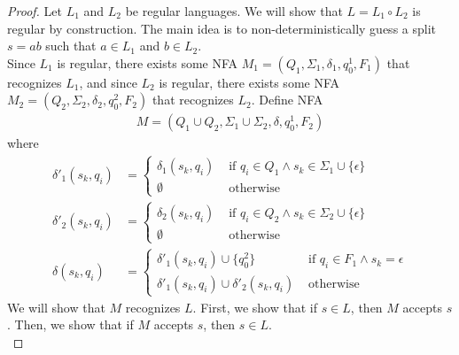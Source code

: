 \documentclass{article}
\begin{document}
\begin{proof}
    Let $L_1$ and $L_2$ be regular languages. We will show that $L = L_1 \circ L_2$ is regular by construction. The main idea is to non-deterministically guess 
    a split $s = a b$ such that $a \in L_1$ and $b \in L_2$. \\

    \noindent
    Since $L_1$ is regular, there exists some NFA $M_1 = (Q_1, \Sigma_1, \delta_1, q_0^1, F_1)$ that recognizes $L_1$, and since $L_2$ is regular, there exists
    some NFA $M_2 = (Q_2, \Sigma_2, \delta_2, q_0^2, F_2)$ that recognizes $L_2$. Define NFA
    \begin{align*}
        M = (Q_1 \cup Q_2, \Sigma_1 \cup \Sigma_2, \delta, q_0^1, F_2)
    \end{align*}
    where
    \begin{align*}
        \delta'_1(s_k, q_i) &= \begin{cases}
            \delta_1(s_k, q_i) & \text{ if } q_i \in Q_1 \land s_k \in \Sigma_1 \cup \{ \epsilon \} \\
            \emptyset & \text{ otherwise}
        \end{cases} \\
        \delta'_2(s_k, q_i) &= \begin{cases}
            \delta_2(s_k, q_i) & \text{ if } q_i \in Q_2 \land s_k \in \Sigma_2 \cup \{ \epsilon \} \\
            \emptyset & \text{ otherwise}
        \end{cases} \\
        \delta(s_k, q_i) &= \begin{cases}
            \delta'_1(s_k, q_i) \cup \{ q_0^2 \} & \text{ if } q_i \in F_1 \land s_k = \epsilon \\
            \delta'_1(s_k, q_i) \cup \delta'_2(s_k, q_i) & \text{ otherwise}
        \end{cases}
    \end{align*}
    We will show that $M$ recognizes $L$. First, we show that if $s \in L$, then $M$ accepts $s$. Then, we show that if $M$ accepts $s$, then $s \in L$. \\


\end{proof}
\end{document}

